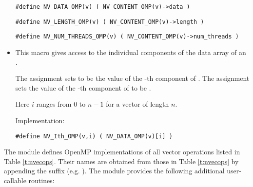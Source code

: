 \begin{itemize}
  \verb|#define NV_DATA_OMP(v) ( NV_CONTENT_OMP(v)->data )|
  
  \verb|#define NV_LENGTH_OMP(v) ( NV_CONTENT_OMP(v)->length )|

  \verb|#define NV_NUM_THREADS_OMP(v) ( NV_CONTENT_OMP(v)->num_threads )|

\item {}                                               
                                                            
  This macro gives access to the individual components of the data
  array of an .

  The assignment  sets  to be the value of 
  the -th component of . The assignment    
  sets the value of the -th component of  to be .        
  
  Here $i$ ranges from $0$ to $n-1$ for a vector of length $n$.

  Implementation:

  \verb|#define NV_Ith_OMP(v,i) ( NV_DATA_OMP(v)[i] )|

\end{itemize}
The {\nvecopenmp} module defines OpenMP implementations of all vector operations listed
in Table \ref{t:nvecops}. Their names are obtained from those in Table \ref{t:nvecops}
by appending the suffix  (e.g. ).
The module {\nvecopenmp} provides the following additional user-callable routines:

